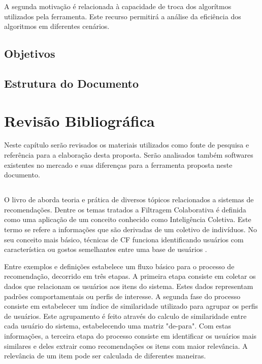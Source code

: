 \documentclass[
	12pt,				%
    oneside,			%
	a4paper,			%
	english,			%
	french,				%
	spanish,			%
	brazil,				%
	]{abntex2}
\begin{document}
A segunda motivação é relacionada à capacidade de troca dos algorítmos utilizados pela ferramenta. Este recurso
permitirá a análise da eficiência dos algoritmos em diferentes cenários.

\section{Objetivos}

\section{Estrutura do Documento}


\chapter{Revisão Bibliográfica}
Neste capítulo serão revisados os materiais utilizados como fonte de pesquisa e referência para a elaboração desta proposta. Serão analisados também softwares 
existentes no mercado e suas diferenças para a ferramenta proposta neste documento.

\section{}
O livro de  aborda teoria e prática de diversos tópicos relacionados a sistemas de recomendações. Dentre os temas tratados 
a Filtragem Colaborativa é definida como uma aplicação de um conceito conhecido como Inteligência Coletiva. Este termo se refere a informações que são derivadas
de um coletivo de indivíduos. No seu conceito mais básico, técnicas de CF funciona identificando usuários com característica ou gostos semelhantes entre uma base
de usuários \cite{1-Oreilly}.

Entre exemplos e definições  estabelece um fluxo básico para o processo de recomendação, decorrido em três etapas. A primeira etapa 
consiste em coletar os dados que relacionam os usuários aos itens do sistema. Estes dados representam padrões comportamentais ou perfis de interesse. A segunda
fase do processo consiste em estabelecer um índice de similaridade utilizado para agrupar os perfis de usuários. Este agrupamento é feito através do calculo de 
similaridade entre cada usuário do sistema, estabelecendo uma matriz "de-para". Com estas informações, a terceira etapa do processo consiste em identificar os
usuários mais similares e deles extrair como recomendações os itens com maior relevância. A relevância de um item pode ser calculada de diferentes maneiras.
\end{document}
